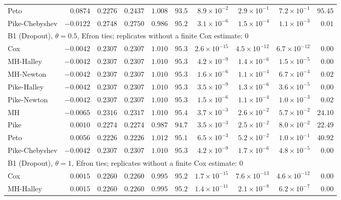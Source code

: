 \begin{landscape}
\begin{longtable}{lrrrrrrrrr}
Peto & $0.0874$ & $0.2276$ & $0.2437$ & $1.008$ & $93.5$ & $8.9 \times 10^{-2}$ & $2.9 \times 10^{-1}$ & $7.2 \times 10^{-1}$ & $95.45$ \\
Pike-Chebyshev & $-0.0122$ & $0.2748$ & $0.2750$ & $0.986$ & $95.2$ & $3.1 \times 10^{-6}$ & $1.5 \times 10^{-4}$ & $1.1 \times 10^{-3}$ & $0.01$ \\
\multicolumn{10}{l}{B1 (Dropout), $\theta = 0.5$, Efron ties; replicates without a finite Cox estimate: 0} \\
Cox & $-0.0042$ & $0.2307$ & $0.2307$ & $1.010$ & $95.3$ & $2.6 \times 10^{-15}$ & $4.5 \times 10^{-12}$ & $6.7 \times 10^{-12}$ & $0.00$ \\
MH-Halley & $-0.0042$ & $0.2307$ & $0.2307$ & $1.010$ & $95.3$ & $4.2 \times 10^{-9}$ & $1.4 \times 10^{-6}$ & $1.5 \times 10^{-5}$ & $0.00$ \\
MH-Newton & $-0.0042$ & $0.2307$ & $0.2307$ & $1.010$ & $95.3$ & $1.6 \times 10^{-6}$ & $1.1 \times 10^{-4}$ & $6.7 \times 10^{-4}$ & $0.02$ \\
Pike-Halley & $-0.0042$ & $0.2307$ & $0.2307$ & $1.010$ & $95.3$ & $3.5 \times 10^{-9}$ & $1.3 \times 10^{-6}$ & $3.6 \times 10^{-5}$ & $0.00$ \\
Pike-Newton & $-0.0042$ & $0.2307$ & $0.2307$ & $1.010$ & $95.3$ & $1.5 \times 10^{-6}$ & $1.1 \times 10^{-4}$ & $1.0 \times 10^{-3}$ & $0.02$ \\
MH & $-0.0065$ & $0.2316$ & $0.2317$ & $1.010$ & $95.4$ & $3.7 \times 10^{-3}$ & $2.6 \times 10^{-2}$ & $5.7 \times 10^{-2}$ & $24.10$ \\
Pike & $0.0010$ & $0.2274$ & $0.2274$ & $0.987$ & $94.7$ & $3.5 \times 10^{-3}$ & $2.5 \times 10^{-2}$ & $8.0 \times 10^{-2}$ & $22.49$ \\
Peto & $0.0056$ & $0.2226$ & $0.2226$ & $1.012$ & $95.1$ & $6.5 \times 10^{-3}$ & $5.2 \times 10^{-2}$ & $1.0 \times 10^{-1}$ & $40.92$ \\
Pike-Chebyshev & $-0.0042$ & $0.2307$ & $0.2307$ & $1.010$ & $95.3$ & $4.2 \times 10^{-9}$ & $1.7 \times 10^{-6}$ & $4.8 \times 10^{-5}$ & $0.00$ \\
\multicolumn{10}{l}{B1 (Dropout), $\theta = 1$, Efron ties; replicates without a finite Cox estimate: 0} \\
Cox & $0.0015$ & $0.2260$ & $0.2260$ & $0.995$ & $95.2$ & $1.7 \times 10^{-15}$ & $7.6 \times 10^{-13}$ & $4.6 \times 10^{-12}$ & $0.00$ \\
MH-Halley & $0.0015$ & $0.2260$ & $0.2260$ & $0.995$ & $95.2$ & $1.4 \times 10^{-11}$ & $2.1 \times 10^{-8}$ & $6.2 \times 10^{-7}$ & $0.00$ \\

\end{longtable}
\end{landscape}
